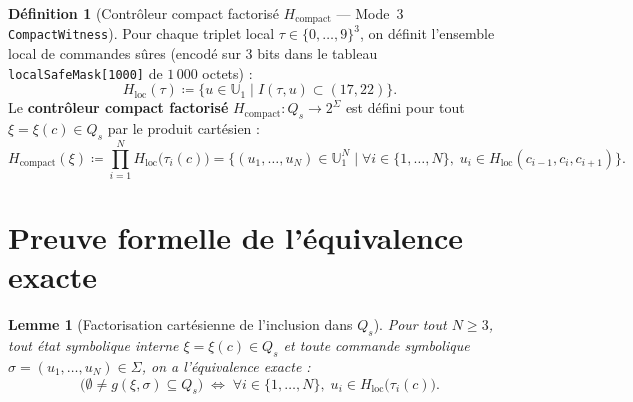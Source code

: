 \documentclass[11pt,a4paper]{article}
\theoremstyle{definition}
\newtheorem{definition}{Définition}
\theoremstyle{plain}
\newtheorem{lemme}{Lemme}
\newcommand{\U}{\mathbb{U}}
\newcommand{\code}[1]{\texttt{#1}}
\begin{document}
\begin{definition}[Contrôleur compact factorisé $H_{\mathrm{compact}}$ --- Mode~3 \code{CompactWitness}]
\label{def:h_compact}
Pour chaque triplet local $\tau \in \{0, \dots, 9\}^3$, on définit l'ensemble local de commandes sûres (encodé sur $3$ bits dans le tableau \code{localSafeMask[1000]} de $1\,000$ octets) :
\begin{equation}
  H_{\mathrm{loc}}(\tau) \coloneqq \bigl\{u \in \U_1 \;\big|\; I(\tau, u) \subset (17, 22)\bigr\}.
  \label{eq:h_loc}
\end{equation}
Le \textbf{contrôleur compact factorisé} $H_{\mathrm{compact}} : Q_s \to 2^\Sigma$ est défini pour tout $\xi = \xi(c) \in Q_s$ par le produit cartésien :
\begin{equation}
  H_{\mathrm{compact}}(\xi) \coloneqq \prod_{i=1}^{N} H_{\mathrm{loc}}\bigl(\tau_i(c)\bigr)
  = \bigl\{(u_1, \dots, u_N) \in \U_1^N \;\big|\; \forall i \in \{1, \dots, N\},\; u_i \in H_{\mathrm{loc}}(c_{i-1}, c_i, c_{i+1})\bigr\}.
  \label{eq:h_compact}
\end{equation}
\end{definition}

\section{Preuve formelle de l'équivalence exacte}

\begin{lemme}[Factorisation cartésienne de l'inclusion dans $Q_s$]
\label{lem:cartesian_factorization}
Pour tout $N \ge 3$, tout état symbolique interne $\xi = \xi(c) \in Q_s$ et toute commande symbolique $\sigma = (u_1, \dots, u_N) \in \Sigma$, on a l'équivalence exacte :
\begin{equation}
  \bigl(\emptyset \neq g(\xi, \sigma) \subseteq Q_s\bigr)
  \;\Longleftrightarrow\;
  \forall i \in \{1, \dots, N\},\; u_i \in H_{\mathrm{loc}}\bigl(\tau_i(c)\bigr).
  \label{eq:cart_equiv}
\end{equation}
\end{lemme}
\end{document}
